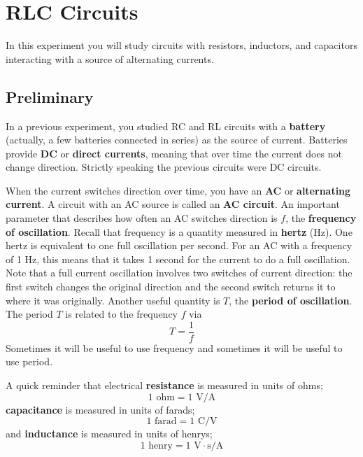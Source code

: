 \setcounter{chapter}{5}
\chapter{RLC Circuits}
In this experiment you will study circuits with resistors, inductors, and capacitors interacting with a source of alternating currents.
\section{Preliminary}
In a previous experiment, you studied RC and RL circuits with a \textbf{battery} (actually, a few batteries connected in series) as the source of current. Batteries provide \textbf{DC} or \textbf{direct currents}, meaning that over time the current does not change direction. Strictly speaking the previous circuits were DC circuits.

When the current switches direction over time, you have an \textbf{AC} or \textbf{alternating current}. A circuit with an AC source is called an \textbf{AC circuit}. An important parameter that describes how often an AC switches direction is $f$, the \textbf{frequency of oscillation}. Recall that frequency is a quantity measured in \textbf{hertz} (Hz). One hertz is equivalent to one full oscillation per second. For an AC with a frequency of 1 Hz, this means that it takes 1 second for the current to do a full oscillation. Note that a full current oscillation involves two switches of current direction: the first switch changes the original direction and the second switch returns it to where it was originally. Another useful quantity is $T$, the \textbf{period of oscillation}. The period $T$ is related to the frequency $f$ via
\begin{equation} \label{eq.06.period}
	T = \frac{1}{f}
\end{equation}
Sometimes it will be useful to use frequency and sometimes it will be useful to use period.

A quick reminder that electrical \textbf{resistance} is measured in units of ohms;
\begin{equation}
	1 \text{ ohm} = 1 \text{ V/A}
\end{equation}
\textbf{capacitance} is measured in units of farads;
\begin{equation}
	1 \text{ farad} = 1 \text{ C/V}
\end{equation}
and \textbf{inductance} is measured in units of henrys;
\begin{equation}
	1 \text{ henry} = 1 \text{ V}\cdot\text{s/A}
\end{equation}
